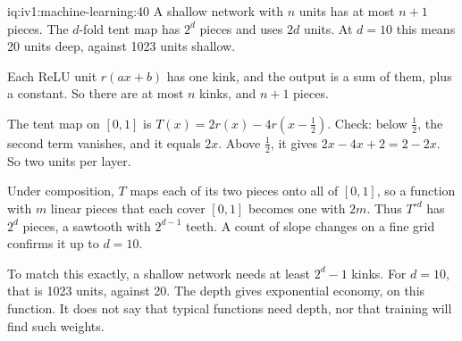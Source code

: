 \begin{solution}{iq:iv1:machine-learning:40}
A shallow network with $n$ units has at most $n + 1$ pieces. The $d$-fold tent map has $2^d$ pieces and uses $2d$ units. At $d = 10$ this means 20 units deep, against 1023 units shallow.

Each ReLU unit $r(a x + b)$ has one kink, and the output is a sum of them, plus a constant. So there are at most $n$ kinks, and $n + 1$ pieces.

The tent map on $[0, 1]$ is $T(x) = 2r(x) - 4r(x - \frac12)$. Check: below $\frac12$, the second term vanishes, and it equals $2x$. Above $\frac12$, it gives $2x - 4x + 2 = 2 - 2x$. So two units per layer.

Under composition, $T$ maps each of its two pieces onto all of $[0, 1]$, so a function with $m$ linear pieces that each cover $[0, 1]$ becomes one with $2m$. Thus $T^{\circ d}$ has $2^d$ pieces, a sawtooth with $2^{d - 1}$ teeth. A count of slope changes on a fine grid confirms it up to $d = 10$.

To match this exactly, a shallow network needs at least $2^d - 1$ kinks. For $d = 10$, that is 1023 units, against 20. The depth gives exponential economy, on this function. It does not say that typical functions need depth, nor that training will find such weights.



\end{solution}

